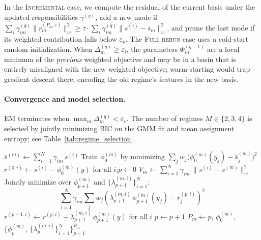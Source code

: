 \documentclass{article}
\begin{document}
\noindent
In the \textsc{Incremental} case, we compute the residual of the
current basis under the updated responsibilities $\gamma^{(q)}$, add
a new mode if $\sum_i \gamma_{im}^{(q)}\|r_m^{(P_m,i)}\|_w^2 \ge \tau\cdot\sum_i \gamma_{im}^{(q)}\|s^{(i)}-\bar{s}_m\|_w^2$,
and prune the last mode if its weighted contribution falls below
$\varepsilon_p$.
The \textsc{Full rerun} case uses a cold-start random initialization.
When $\Delta_m^{(q)} \ge \varepsilon_l$, the parameters
$\Phi_m^{(q-1)}$ are a local minimum of the \emph{previous}
weighted objective and may be in a basin that is entirely
misaligned with the new weighted objective; warm-starting would
trap gradient descent there, encoding the old regime's features
in the new basis.

\paragraph{Convergence and model selection.}
EM terminates when $\max_m \Delta_m^{(q)} < \varepsilon_c$.
The number of regimes $M \in \{2,3,4\}$ is selected by jointly
minimizing BIC on the GMM fit and mean assignment entropy;
see Table~\ref{tab:regime_selection}.

\begin{algorithm}[t]
\caption{\textsc{WeightedNeuralPOD}$\bigl(
  \{s^{(i)}, \gamma_{im}\}_{i=1}^N,\;
  \tau\bigr)$}
\label{alg:npod}
\begin{algorithmic}[1]
\State $\bar{s}^{(m)} \leftarrow \displaystyle\sum_{i=1}^N \gamma_{im}\,s^{(i)}$
  \hfill{}
\State Train $\phi_0^{(m)}$ by minimizing
  $\displaystyle\sum_j w_j\bigl(\phi_0^{(m)}(y_j) - \bar{s}^{(m)}_j\bigr)^2$
\State $r^{(0,i)} \leftarrow s^{(i)} - \phi_0^{(m)}(y)$
  \enspace for all $i$;\enspace $p \leftarrow 0$
\State $V_m \leftarrow \displaystyle\sum_{i=1}^N \gamma_{im}\,\|s^{(i)}-\bar{s}^{(m)}\|_w^2$
  \hfill{}
  \State Jointly minimize over $\phi_{p+1}^{(m)}$ and
    $\{\lambda_{p+1}^{(m,i)}\}_{i=1}^N$:
    \[
      \sum_{i=1}^N \gamma_{im}
      \sum_j w_j\!\left(\lambda_{p+1}^{(m,i)}\,\phi_{p+1}^{(m)}(y_j)
      - r^{(p,i)}_j\right)^{\!2}
    \]
  \State $r^{(p+1,i)} \leftarrow r^{(p,i)}
    - \lambda_{p+1}^{(m,i)}\,\phi_{p+1}^{(m)}(y)$
    \enspace for all $i$
  \State $p \leftarrow p + 1$
\EndWhile
\State \Return $P_m \!\leftarrow\! p$,\enspace
  $\phi_0^{(m)}$,\enspace
  $\bigl\{\phi_p^{(m)},\,\{\lambda_p^{(m,i)}\}_{i=1}^N\bigr\}_{p=1}^{P_m}$
\end{algorithmic}
\end{algorithm}
\end{document}
